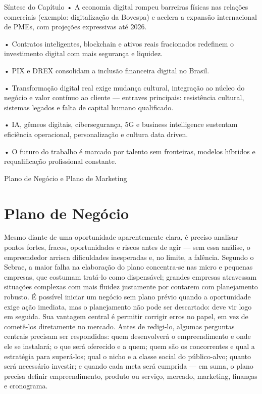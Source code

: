 Síntese do Capítulo • A economia digital rompeu barreiras físicas nas relações comerciais (exemplo: digitalização da Bovespa) e acelera a expansão internacional de PMEs, com projeções expressivas até 2026.

• Contratos inteligentes, blockchain e ativos reais fracionados redefinem o investimento digital com mais segurança e liquidez.

• PIX e DREX consolidam a inclusão financeira digital no Brasil.

• Transformação digital real exige mudança cultural, integração ao núcleo do negócio e valor contínuo ao cliente — entraves principais: resistência cultural, sistemas legados e falta de capital humano qualificado.

• IA, gêmeos digitais, cibersegurança, 5G e business intelligence sustentam eficiência operacional, personalização e cultura data driven.

• O futuro do trabalho é marcado por talento sem fronteiras, modelos híbridos e requalificação profissional constante.

Plano de Negócio e Plano de Marketing

\chapter{Plano de Negócio}

Mesmo diante de uma oportunidade aparentemente clara, é preciso analisar pontos fortes, fracos, oportunidades e riscos antes de agir — sem essa análise, o empreendedor arrisca dificuldades inesperadas e, no limite, a falência. Segundo o Sebrae, a maior falha na elaboração do plano concentra-se nas micro e pequenas empresas, que costumam tratá-lo como dispensável; grandes empresas atravessam situações complexas com mais fluidez justamente por contarem com planejamento robusto. É possível iniciar um negócio sem plano prévio quando a oportunidade exige ação imediata, mas o planejamento não pode ser descartado: deve vir logo em seguida. Sua vantagem central é permitir corrigir erros no papel, em vez de cometê-los diretamente no mercado. Antes de redigi-lo, algumas perguntas centrais precisam ser respondidas: quem desenvolverá o empreendimento e onde ele se instalará; o que será oferecido e a quem; quem são os concorrentes e qual a estratégia para superá-los; qual o nicho e a classe social do público-alvo; quanto será necessário investir; e quando cada meta será cumprida — em suma, o plano precisa definir empreendimento, produto ou serviço, mercado, marketing, finanças e cronograma.

